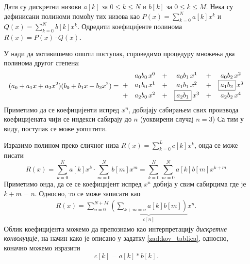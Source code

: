 \PID\label{z:konv_pol_pol}
Дати су дискретни низови $a[k]$ за $0 \leq k \leq N$ и $b[k]$ за $0 \leq k \leq M$. Нека су дефинисани полиноми 
помоћу тих низова као $P(x) = \sum_{k = 0}^{N} a[k] x^k$ и $Q(x) = \sum_{k = 0}^{N} b[k] x^k$. Одредити 
коефицијенте полинома $R(x) = P(x) \cdot Q(x)$.

\RESENJE

\noindent 

У нади да мотивишемо општи поступак, спроведимо процедуру множења два полинома другог степена: 
\begin{eqnarray}
    (a_0 + a_1 x + a_2 x^2) (b_0 + b_1 x + b_2 x^2) &=& \hspace*{-5mm}
    \begin{matrix}
        & & a_0b_0\, x^0  &+& a_0b_1\, x^1 &+& a_0b_2\, x^2 \\
        &+& a_1b_0\, x^1  &+& a_1b_1\, x^2 &+& \boxed{a_1b_2}\, x^3 \\
        &+& a_2b_0\, x^2  &+& \boxed{a_2b_1}\, x^3 &+& a_2b_2\, x^4 \\
    \end{matrix} 
\end{eqnarray}
Приметимо да се коефицијенти испред $x^n$, добијају сабирањем свих производа коефицијената чији се индекси сабирају до $n$ 
(уоквирени случај $n=3$)
Са тим у виду, поступак се може уопштити.

Изразимо полином преко сличног низа $R(x) = \sum_{k=0}^{L} c[k] x^k$, онда се може писати
\begin{equation}
    R(x) = \sum_{k = 0}^{N} a[k] x^k \cdot  \sum_{m = 0}^{N} b[m] x^m = \sum_{k = 0}^{N}  \sum_{m = 0}^{N} a[k]b[m] x^{k+m}
\end{equation}
Приметимо онда, да се се коефицијент испред $x^n$ добија у свим сабирцима где је $k+m=n$. Односно, то се може записати као 
\begin{eqnarray}
    R(x) = \sum_{n = 0}^{N+M} \underbrace{\left( \sum_{k + m = n} a[k]b[m] \right)}_{c[n]} x^n.
\end{eqnarray}
Облик коефицијента можемо да препознамо као интерпретацију \textit{дискретне конволуције}, на начин како је описано у задатку 
\ref{zad:kov_tablica}, односно, коначно можемо изразити 
\begin{equation}
    c[k] = a[k] \ast b[k].
\end{equation}